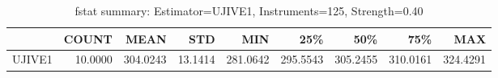 \begin{table}[ht]
\centering
\caption{fstat summary: Estimator=UJIVE1, Instruments=125, Strength=0.40}
\begin{tabular}{lrrrrrrrr}
\toprule
 & COUNT & MEAN & STD & MIN & 25\% & 50\% & 75\% & MAX \\
\midrule
UJIVE1 & 10.0000 & 304.0243 & 13.1414 & 281.0642 & 295.5543 & 305.2455 & 310.0161 & 324.4291 \\
\bottomrule
\end{tabular}
\end{table}
